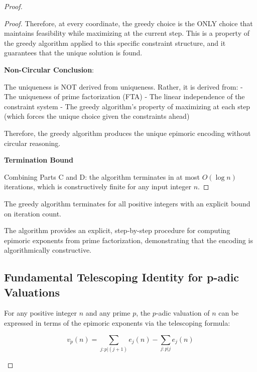 \begin{proof}
\begin{theorem}
\begin{proof}
Therefore, at every coordinate, the greedy choice is the ONLY choice that maintains feasibility while maximizing at the current step. This is a property of the greedy algorithm applied to this specific constraint structure, and it guarantees that the unique solution is found.

\noindent \textbf{Non-Circular Conclusion}:

The uniqueness is NOT derived from uniqueness. Rather, it is derived from:
- The uniqueness of prime factorization (FTA)
- The linear independence of the constraint system
- The greedy algorithm's property of maximizing at each step (which forces the unique choice given the constraints ahead)

Therefore, the greedy algorithm produces the unique epimoric encoding without circular reasoning.

\noindent \textbf{Termination Bound}

Combining Parts C and D: the algorithm terminates in at most $O(\log n)$ iterations, which is constructively finite for any input integer $n$.

\end{proof}

\end{theorem}

\noindent The greedy algorithm terminates for all positive integers with an explicit bound on iteration count.

\noindent The algorithm provides an explicit, step-by-step procedure for computing epimoric exponents from prime factorization, demonstrating that the encoding is algorithmically constructive.

\subsection{Fundamental Telescoping Identity for p-adic Valuations}
\label{subsec:telescoping-formula}

\begin{theorem}
\label{thm:telescoping-identity-formal}

For any positive integer $n$ and any prime $p$, the $p$-adic valuation of $n$ can be expressed in terms of the epimoric exponents via the telescoping formula:

\begin{equation}
\label{eq:fundamental-telescoping}
v_p(n) = \sum_{j: p|(j+1)} e_j(n) - \sum_{j: p|j} e_j(n)
\end{equation}


\end{theorem}
\end{proof}
